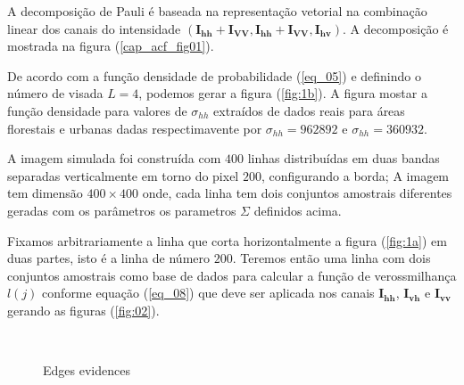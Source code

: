 \documentclass[conference]{IEEEtran}
\begin{document}
A decomposição de Pauli é baseada na representação vetorial na combinação linear dos canais do intensidade $(\mathbf{I_{hh}+I_{VV}}, \mathbf{I_{hh}+I_{VV}}, \mathbf{I_{hv}})$. A decomposição é mostrada na figura (\ref{cap_acf_fig01}). 

De acordo com a função densidade de probabilidade (\ref{eq_05}) e definindo o número de visada $L=4$, podemos gerar a figura (\ref{fig:1b}). A figura mostar a função densidade para valores de $\sigma_{hh}$ extraídos de dados reais para áreas florestais e urbanas dadas respectimavente por $\sigma_{hh}=962892$ e $\sigma_{hh}= 360932$. 

A imagem simulada foi construída com $400$ linhas distribuídas em duas bandas separadas verticalmente em torno do pixel $200$, configurando a borda; A imagem tem dimensão $400 \times 400$ onde, cada linha  tem dois conjuntos amostrais diferentes geradas com os parâmetros os parametros $\Sigma$ definidos acima.  

	Fixamos arbitrariamente a linha que corta horizontalmente a figura (\ref{fig:1a}) em duas partes, isto é a linha de número $200$. Teremos então uma linha com dois conjuntos amostrais como base de dados para calcular a função de verossmilhança $l(j)$ conforme equação (\ref{eq_08}) que deve ser aplicada nos canais $\mathbf{I_{hh}}$, $\mathbf{I_{vh}}$ e $\mathbf{I_{vv}}$ gerando as figuras (\ref{fig:02}).  
 \begin{figure}[!ht]
     \hfill
     \\
     \centering
     \caption{Edges evidences}
     \label{fig_02}
   \end{figure}	
	
\end{document}

